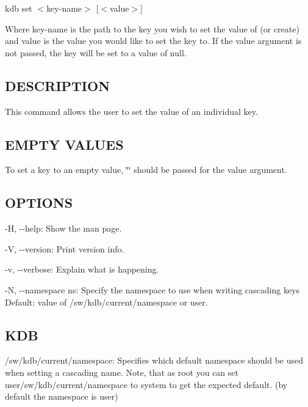 {\ttfamily kdb set $<$key-\/name$>$ \mbox{[}$<$value$>$\mbox{]}}

Where {\ttfamily key-\/name} is the path to the key you wish to set the value of (or create) and {\ttfamily value} is the value you would like to set the key to. If the {\ttfamily value} argument is not passed, the key will be set to a value of {\ttfamily null}.

\subsection*{D\+E\+S\+C\+R\+I\+P\+T\+I\+O\+N}

This command allows the user to set the value of an individual key.

\subsection*{E\+M\+P\+T\+Y V\+A\+L\+U\+E\+S}

To set a key to an empty value, {\ttfamily \char`\"{}\char`\"{}} should be passed for the {\ttfamily value} argument.

\subsection*{O\+P\+T\+I\+O\+N\+S}


\begin{DoxyItemize}
\item {\ttfamily -\/\+H}, {\ttfamily -\/-\/help}\+: Show the man page.
\item {\ttfamily -\/\+V}, {\ttfamily -\/-\/version}\+: Print version info.
\item {\ttfamily -\/v}, {\ttfamily -\/-\/verbose}\+: Explain what is happening.
\item {\ttfamily -\/\+N}, {\ttfamily -\/-\/namespace ns}\+: Specify the namespace to use when writing cascading keys Default\+: value of {\ttfamily /sw/kdb/current/namespace} or user.
\end{DoxyItemize}

\subsection*{K\+D\+B}


\begin{DoxyItemize}
\item {\ttfamily /sw/kdb/current/namespace}\+: Specifies which default namespace should be used when setting a cascading name. Note, that as root you can set {\ttfamily user/sw/kdb/current/namespace} to {\ttfamily system} to get the expected default. (by default the namespace is user)
\end{DoxyItemize}

